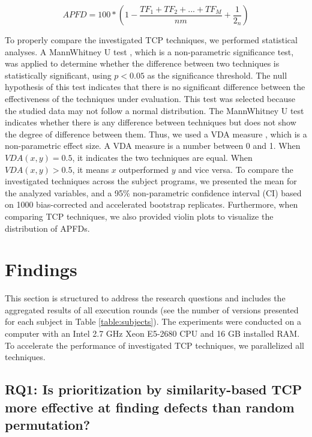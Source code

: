\documentclass[runningheads]{llncs}
\begin{document}
$$ APFD = 100 * (1- \frac{ TF_1 + TF_2 + ... + TF_M } { nm } + \frac{1} { 2_n }) $$
 
To properly compare the investigated TCP techniques, we performed statistical analyses. A Mann\textendash Whitney U test \cite{arcuri2011practical}, which is a non-parametric significance test, was applied to determine whether the difference between two techniques is statistically significant, using $p<0.05$ as the significance threshold. The null hypothesis of this test indicates that there is no significant difference between the effectiveness of the techniques under evaluation. This test was selected because the studied data may not follow a normal distribution. The Mann\textendash Whitney U test indicates whether there is any difference between techniques but does not show the degree of difference between them. Thus, we used a VDA measure \cite{arcuri2011practical}, which is a non-parametric effect size. A VDA measure is a number between 0 and 1. When $VDA(x, y)=0.5$, it indicates the two techniques are equal. When $VDA(x, y)>0.5$, it means $x$ outperformed $y$ and vice versa. To compare the investigated techniques across the subject programs, we presented the mean for the analyzed variables, and a 95\% non-parametric confidence interval (CI) based on 1000 bias-corrected and accelerated bootstrap replicates. Furthermore, when comparing TCP techniques, we also provided violin plots to visualize the distribution of APFDs.



\section{Findings}
This section is structured to address the research questions and includes the aggregated results of all execution rounds (see the number of versions presented for each subject in Table \ref{table:subjects}). The experiments were conducted on a computer with an Intel 2.7 GHz Xeon E5-2680 CPU and 16 GB installed RAM. To accelerate the performance of investigated TCP techniques, we parallelized all techniques.

\subsection{RQ1: Is prioritization by similarity-based TCP more effective at finding defects than random permutation?}
\end{document}
